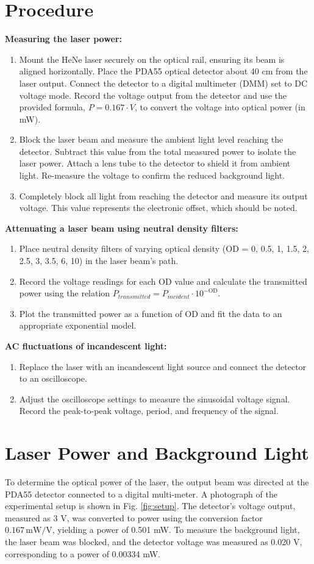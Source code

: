\documentclass[12pt]{article}
\begin{document}
\section*{Procedure}
\textbf{Measuring the laser power:}
\begin{enumerate}
    \item Mount the HeNe laser securely on the optical rail, ensuring its beam is aligned horizontally. Place the PDA55 optical detector about 40 cm from the laser output. Connect the detector to a digital multimeter (DMM) set to DC voltage mode. Record the voltage output from the detector and use the provided formula, \( P = 0.167 \cdot V \), to convert the voltage into optical power (in mW).
    \item Block the laser beam and measure the ambient light level reaching the detector. Subtract this value from the total measured power to isolate the laser power. Attach a lens tube to the detector to shield it from ambient light. Re-measure the voltage to confirm the reduced background light.
    \item Completely block all light from reaching the detector and measure its output voltage. This value represents the electronic offset, which should be noted.
\end{enumerate}
\textbf{Attenuating a laser beam using neutral density filters:}
\begin{enumerate}
    \item Place neutral density filters of varying optical density (OD = 0, 0.5, 1, 1.5, 2, 2.5, 3, 3.5, 6, 10) in the laser beam's path.
    \item Record the voltage readings for each OD value and calculate the transmitted power using the relation \( P_{transmitted} = P_{incident} \cdot 10^{-\text{OD}} \).
    \item Plot the transmitted power as a function of OD and fit the data to an appropriate exponential model.
\end{enumerate}
\textbf{AC fluctuations of incandescent light:}
\begin{enumerate}
    \item Replace the laser with an incandescent light source and connect the detector to an oscilloscope.
    \item Adjust the oscilloscope settings to measure the sinusoidal voltage signal. Record the peak-to-peak voltage, period, and frequency of the signal.
\end{enumerate}

\section*{Laser Power and Background Light}
To determine the optical power of the laser, the output beam was directed at the PDA55 detector connected to a digital multi-meter. A photograph of the experimental setup is shown in Fig. \ref{fig:setup}. The detector's voltage output, measured as 3 V, was converted to power using the conversion factor \(0.167 \, \text{mW/V}\), yielding a power of 0.501 mW. To measure the background light, the laser beam was blocked, and the detector voltage was measured as 0.020 V, corresponding to a power of 0.00334 mW.
\end{document}
